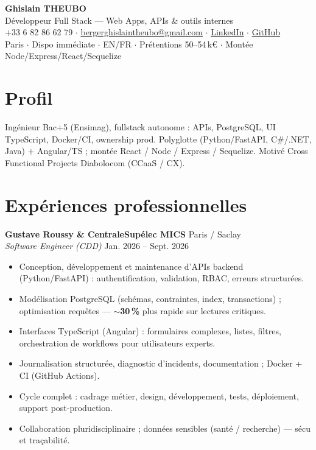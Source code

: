 \documentclass[10pt,a4paper]{article}
\begin{document}
\begin{center}
{\LARGE\bfseries Ghislain THEUBO}\\[1pt]
{\large D\'eveloppeur Full Stack --- Web Apps, APIs \& outils internes}\\[2pt]
+33 6 82 86 62 79 $\cdot$
\href{mailto:bergerghislaintheubo@gmail.com}{bergerghislaintheubo@gmail.com} $\cdot$
\href{https://www.linkedin.com/in/berger-ghislain}{LinkedIn} $\cdot$
\href{https://github.com/Bergerghislain}{GitHub}\\[1pt]
Paris $\cdot$ Dispo imm\'ediate $\cdot$ EN/FR $\cdot$ Pr\'etentions 50--54\,k€ $\cdot$ Mont\'ee Node/Express/React/Sequelize
\end{center}

\section{Profil}
Ing\'enieur Bac+5 (Ensimag), fullstack autonome : APIs, PostgreSQL, UI TypeScript, Docker/CI, ownership prod. Polyglotte (Python/FastAPI, C\#/.NET, Java) + Angular/TS ; mont\'ee React / Node / Express / Sequelize. Motiv\'e Cross Functional Projects Diabolocom (CCaaS / CX).

\section{Exp\'eriences professionnelles}
\textbf{Gustave Roussy \& CentraleSup\'elec MICS} \hfill Paris / Saclay\\
\textit{Software Engineer (CDD)} \hfill Jan. 2026 -- Sept. 2026
\begin{itemize}
  \item Conception, d\'eveloppement et maintenance d'APIs backend (Python/FastAPI) : authentification, validation, RBAC, erreurs structur\'ees.
  \item Mod\'elisation PostgreSQL (sch\'emas, contraintes, index, transactions) ; optimisation requ\^etes --- $\sim$\textbf{30\,\%} plus rapide sur lectures critiques.
  \item Interfaces TypeScript (Angular) : formulaires complexes, listes, filtres, orchestration de workflows pour utilisateurs experts.
  \item Journalisation structur\'ee, diagnostic d'incidents, documentation ; Docker + CI (GitHub Actions).
  \item Cycle complet : cadrage m\'etier, design, d\'eveloppement, tests, d\'eploiement, support post-production.
  \item Collaboration pluridisciplinaire ; donn\'ees sensibles (sant\'e / recherche) --- s\'ecu et tra\c{c}abilit\'e.
\end{itemize}
\end{document}
